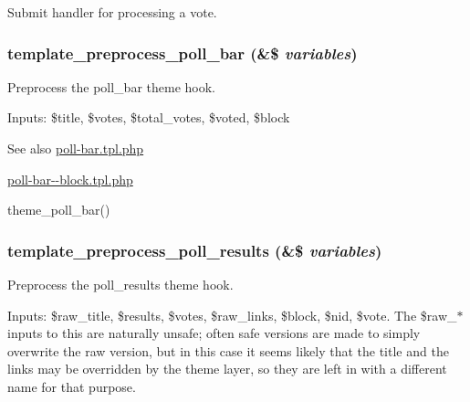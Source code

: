 \label{poll_8module_a93d35efa34833d1b825d657bc5f26195}
Submit handler for processing a vote. \hypertarget{poll_8module_a65f1b1e0fa803234fe9cde359e79a824}{
\subsubsection[{template\_\-preprocess\_\-poll\_\-bar}]{\setlength{\rightskip}{0pt plus 5cm}template\_\-preprocess\_\-poll\_\-bar (\&\$ {\em variables})}}
\label{poll_8module_a65f1b1e0fa803234fe9cde359e79a824}
Preprocess the poll\_\-bar theme hook.

Inputs: \$title, \$votes, \$total\_\-votes, \$voted, \$block

\begin{DoxySeeAlso}{See also}
\hyperlink{poll-bar_8tpl_8php}{poll-\/bar.tpl.php} 

\hyperlink{poll-bar--block_8tpl_8php}{poll-\/bar-\/-\/block.tpl.php} 

theme\_\-poll\_\-bar() 
\end{DoxySeeAlso}
\hypertarget{poll_8module_a4797e0810a85deacc6dcc9bedf24d235}{
\subsubsection[{template\_\-preprocess\_\-poll\_\-results}]{\setlength{\rightskip}{0pt plus 5cm}template\_\-preprocess\_\-poll\_\-results (\&\$ {\em variables})}}
\label{poll_8module_a4797e0810a85deacc6dcc9bedf24d235}
Preprocess the poll\_\-results theme hook.

Inputs: \$raw\_\-title, \$results, \$votes, \$raw\_\-links, \$block, \$nid, \$vote. The \$raw\_\-$\ast$ inputs to this are naturally unsafe; often safe versions are made to simply overwrite the raw version, but in this case it seems likely that the title and the links may be overridden by the theme layer, so they are left in with a different name for that purpose.

